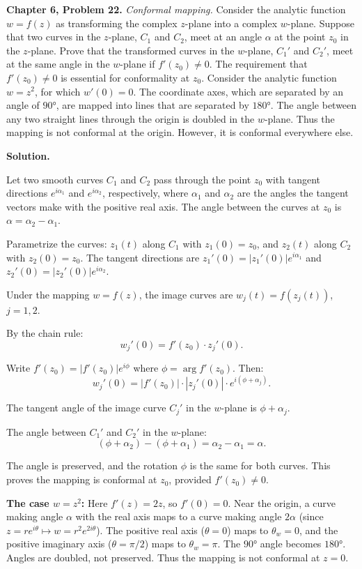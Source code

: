 \documentclass[12pt]{article}
\begin{document}
\textbf{Chapter 6, Problem 22.} \textit{Conformal mapping.} Consider the analytic function $w = f(z)$ as transforming the complex $z$-plane into a complex $w$-plane. Suppose that two curves in the $z$-plane, $C_1$ and $C_2$, meet at an angle $\alpha$ at the point $z_0$ in the $z$-plane. Prove that the transformed curves in the $w$-plane, $C_1'$ and $C_2'$, meet at the same angle in the $w$-plane if $f'(z_0) \neq 0$. The requirement that $f'(z_0) \neq 0$ is essential for conformality at $z_0$. Consider the analytic function $w = z^2$, for which $w'(0) = 0$. The coordinate axes, which are separated by an angle of $90°$, are mapped into lines that are separated by $180°$. The angle between any two straight lines through the origin is doubled in the $w$-plane. Thus the mapping is not conformal at the origin. However, it is conformal everywhere else.

\bigskip
\textbf{Solution.}

Let two smooth curves $C_1$ and $C_2$ pass through the point $z_0$ with tangent directions $e^{i\alpha_1}$ and $e^{i\alpha_2}$, respectively, where $\alpha_1$ and $\alpha_2$ are the angles the tangent vectors make with the positive real axis. The angle between the curves at $z_0$ is $\alpha = \alpha_2 - \alpha_1$.

Parametrize the curves: $z_1(t)$ along $C_1$ with $z_1(0) = z_0$, and $z_2(t)$ along $C_2$ with $z_2(0) = z_0$. The tangent directions are $z_1'(0) = |z_1'(0)|e^{i\alpha_1}$ and $z_2'(0) = |z_2'(0)|e^{i\alpha_2}$.

Under the mapping $w = f(z)$, the image curves are $w_j(t) = f(z_j(t))$, $j = 1,2$.

By the chain rule:
\[
w_j'(0) = f'(z_0)\cdot z_j'(0).
\]

Write $f'(z_0) = |f'(z_0)|e^{i\phi}$ where $\phi = \arg f'(z_0)$. Then:
\[
w_j'(0) = |f'(z_0)|\cdot|z_j'(0)|\cdot e^{i(\phi + \alpha_j)}.
\]

The tangent angle of the image curve $C_j'$ in the $w$-plane is $\phi + \alpha_j$.

The angle between $C_1'$ and $C_2'$ in the $w$-plane:
\[
(\phi + \alpha_2) - (\phi + \alpha_1) = \alpha_2 - \alpha_1 = \alpha.
\]

The angle is preserved, and the rotation $\phi$ is the same for both curves. This proves the mapping is conformal at $z_0$, provided $f'(z_0) \neq 0$.

\textbf{The case $w = z^2$:} Here $f'(z) = 2z$, so $f'(0) = 0$. Near the origin, a curve making angle $\alpha$ with the real axis maps to a curve making angle $2\alpha$ (since $z = re^{i\theta} \mapsto w = r^2 e^{2i\theta}$). The positive real axis ($\theta = 0$) maps to $\theta_w = 0$, and the positive imaginary axis ($\theta = \pi/2$) maps to $\theta_w = \pi$. The $90°$ angle becomes $180°$. Angles are doubled, not preserved. Thus the mapping is not conformal at $z = 0$.
\end{document}
